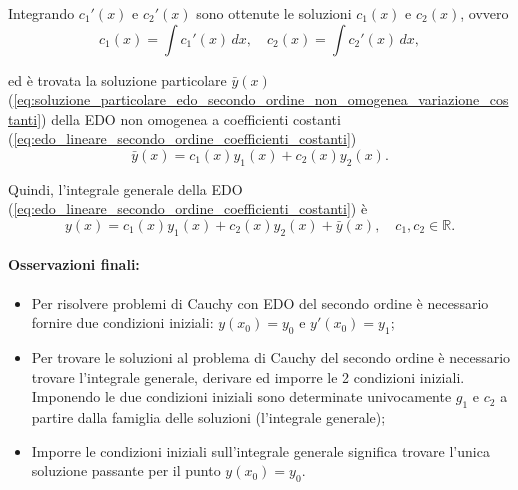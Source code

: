 Integrando $c_1'(x)$ e $c_2'(x)$ sono ottenute le soluzioni $c_1(x)$ e $c_2(x)$, ovvero
\begin{equation*}
	c_1(x) = \int c_1'(x)\, dx,\quad c_2(x) = \int c_2'(x)\, dx,
\end{equation*}

ed è trovata la soluzione particolare $\bar y(x)$ (\ref{eq:soluzione_particolare_edo_secondo_ordine_non_omogenea_variazione_costanti}) della EDO non omogenea a coefficienti costanti (\ref{eq:edo_lineare_secondo_ordine_coefficienti_costanti})
\begin{equation*}
	\bar{y}(x) = c_1(x) y_1(x) + c_2(x) y_2(x).
\end{equation*}

Quindi, l'integrale generale della EDO (\ref{eq:edo_lineare_secondo_ordine_coefficienti_costanti}) è
\begin{equation*}
	y(x) = c_1(x) y_1(x) + c_2(x) y_2(x) + \bar y(x),\quad c_1,c_2\in\mathbb{R}.
\end{equation*}

\paragraph{Osservazioni finali:} 
\begin{itemize}
	\item Per risolvere problemi di Cauchy con EDO del secondo ordine è necessario fornire due condizioni iniziali: $y(x_0)=y_0$ e $y'(x_0)=y_1$;
	\item Per trovare le soluzioni al problema di Cauchy del secondo ordine è necessario trovare l'integrale generale, derivare ed imporre le 2 condizioni iniziali. Imponendo le due condizioni iniziali sono determinate univocamente $g_1$ e $c_2$ a partire dalla famiglia delle soluzioni (l'integrale generale);
	\item Imporre le condizioni iniziali sull'integrale generale significa trovare l'unica soluzione passante per il punto $y(x_0) = y_0$.
\end{itemize}


